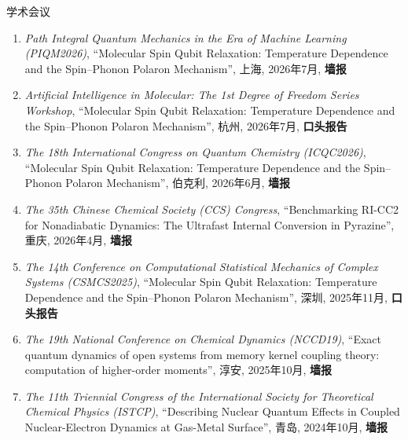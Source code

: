 \documentclass{resume}
\begin{document}
\begin{rSection}{学术会议}
\begin{enumerate}
    \item \emph{Path Integral Quantum Mechanics in the Era of Machine Learning (PIQM2026)}, ``Molecular Spin Qubit Relaxation: Temperature Dependence and the Spin–Phonon Polaron Mechanism'', 上海, 2026年7月, \textbf{墙报} 
    \item \emph{Artificial Intelligence in Molecular: The 1st Degree of Freedom Series Workshop}, ``Molecular Spin Qubit Relaxation: Temperature Dependence and the Spin–Phonon Polaron Mechanism'', 杭州, 2026年7月, \textbf{口头报告} 
    \item \emph{The 18th International Congress on Quantum Chemistry (ICQC2026)}, ``Molecular Spin Qubit Relaxation: Temperature Dependence and the Spin–Phonon Polaron Mechanism'', 伯克利, 2026年6月, \textbf{墙报} 
    \item \emph{The 35th Chinese Chemical Society (CCS) Congress}, ``Benchmarking RI-CC2 for Nonadiabatic Dynamics: The Ultrafast Internal Conversion in Pyrazine'', 重庆, 2026年4月, \textbf{墙报} 
    \item \emph{The 14th Conference on Computational Statistical Mechanics of Complex Systems (CSMCS2025)}, ``Molecular Spin Qubit Relaxation: Temperature Dependence and the Spin–Phonon Polaron Mechanism'', 深圳, 2025年11月, \textbf{口头报告} 
    \item \emph{The 19th National Conference on Chemical Dynamics (NCCD19)}, ``Exact quantum dynamics of open systems from memory kernel coupling theory: computation of higher-order moments'', 淳安, 2025年10月, \textbf{墙报} 
    \item \emph{The 11th Triennial Congress of the International Society for Theoretical Chemical Physics (ISTCP)}, ``Describing Nuclear Quantum Effects in Coupled Nuclear-Electron Dynamics at Gas-Metal Surface'', 青岛, 2024年10月, \textbf{墙报} 
\end{enumerate}
\end{rSection}
\end{document}
